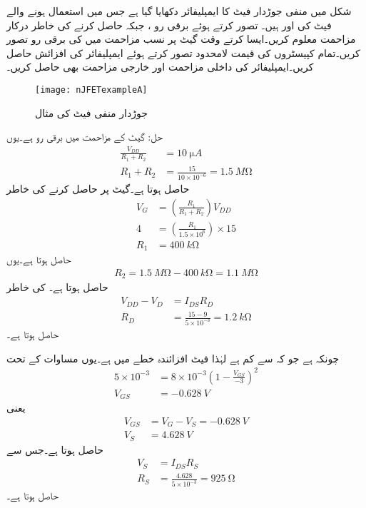 شکل  میں منفی جوڑدار فیٹ کا ایمپلیفائر دکھایا گیا ہے جس میں استعمال ہونے والے فیٹ کی  اور  ہیں۔ تصور کرتے ہوئے برقی رو ،  جبکہ  حاصل کرنے کی خاطر درکار مزاحمت معلوم کریں۔ایسا کرتے وقت گیٹ پر نسب مزاحمت میں  کی برقی رو تصور کریں۔تمام کپیسٹروں کی قیمت لامحدود تصور کرتے ہوئے ایمپلیفائر کی افزائش  حاصل کریں۔ایمپلیفائر کی داخلی مزاحمت  اور خارجی مزاحمت  بھی حاصل کریں۔

\begin{figure}
\centering
\texttt{[image: nJFETexampleA]}
\caption{جوڑدار منفی فیٹ کی مثال}
\label{شکل_جوڑدار_منفی_فیٹ_مثال}
\end{figure}

حل:
گیٹ کے مزاحمت میں  برقی رو ہے۔یوں
\begin{align*}
\frac{V_{DD}}{R_1+R_2} &=\SI{10}{\micro A} \\
R_1+R_2&=\frac{15}{10 \times 10^{-6}}=\SI{1.5}{M \ohm}
\end{align*}
حاصل ہوتا ہے۔گیٹ پر  حاصل کرنے کی خاطر
\begin{align*}
V_G&=\left(\frac{R_1}{R_1+R_2} \right) V_{DD} \\
4&=\left(\frac{R_1}{1.5 \times 10^6}\right) \times 15 \\
R_1&=\SI{400}{k \ohm}
\end{align*}
حاصل ہوتا ہے۔یوں
\begin{align*}
R_2=\SI{1.5}{M \ohm}-\SI{400}{k \ohm}=\SI{1.1}{M \ohm}
\end{align*}
حاصل ہوتا ہے۔ کی خاطر
\begin{align*}
V_{DD}-V_D&=I_{DS} R_D \\
R_D &=\frac{15-9}{5 \times 10^{-3}}=\SI{1.2}{k \ohm}
\end{align*}
حاصل ہوتا ہے۔

چونکہ  ہے جو کہ  سے کم ہے لہٰذا فیٹ افزائندہ خطے میں ہے۔یوں مساوات  کے تحت
\begin{align*}
5 \times 10^{-3}&=8 \times 10^{-3} \left(1-\frac{V_{GS}}{-3} \right)^2 \\
V_{GS}&=\SI{-0.628}{V}
\end{align*}
یعنی
\begin{align*}
V_{GS}&=V_G-V_S=\SI{-0.628}{V} \\
V_S&=\SI{4.628}{V}
\end{align*}
حاصل ہوتا ہے۔جس سے
\begin{align*}
V_S &=I_{DS} R_S \\
R_S&=\frac{4.628}{5 \times 10^{-3}}=\SI{925}{\ohm}
\end{align*}
حاصل ہوتا ہے۔

